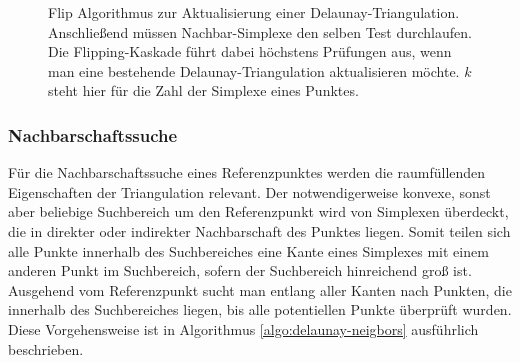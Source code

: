 \begin{figure}[bhpt]
  \caption{
    Flip Algorithmus zur Aktualisierung einer Delaunay-Triangulation.
    Anschließend müssen Nachbar-Simplexe den selben Test durchlaufen.
    Die Flipping-Kaskade führt dabei höchstens  Prüfungen aus, wenn man eine bestehende Delaunay-Triangulation aktualisieren möchte.
    $k$ steht hier für die Zahl der Simplexe eines Punktes.
  }
  \label{fig:delaunay-flip}
\end{figure}

\subsubsection{Nachbarschaftssuche}
Für die Nachbarschaftssuche eines Referenzpunktes werden die raumfüllenden Eigenschaften der Triangulation relevant.
Der notwendigerweise konvexe, sonst aber beliebige Suchbereich um den Referenzpunkt wird von Simplexen überdeckt, die in direkter oder indirekter Nachbarschaft des Punktes liegen.
Somit teilen sich alle Punkte innerhalb des Suchbereiches eine Kante eines Simplexes mit einem anderen Punkt im Suchbereich, sofern der Suchbereich hinreichend groß ist.
Ausgehend vom Referenzpunkt sucht man entlang aller Kanten nach Punkten, die innerhalb des Suchbereiches liegen, bis alle potentiellen Punkte überprüft wurden.
Diese Vorgehensweise ist in Algorithmus \ref{algo:delaunay-neigbors} ausführlich beschrieben.

